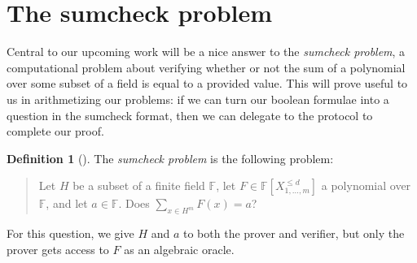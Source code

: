 \documentclass[english,12pt]{reedthesis}
\theoremstyle{plain}
\newtheorem{thm}{Theorem}[section]
\theoremstyle{definition}
\newtheorem{defn}[defn]{Definition}
\theoremstyle{remark}
\DeclarePairedDelimiter{\abs}{\lvert}{\rvert}
\begin{document}





\section{The sumcheck problem}

Central to our upcoming work will be a nice answer to the \emph{sumcheck
  problem}, a computational problem about verifying whether or not the sum of a
polynomial over some subset of a field is equal to a provided value. This will
prove useful to us in arithmetizing our problems: if we can turn our boolean
formulae into a question in the sumcheck format, then we can delegate to the
protocol to complete our proof.

\begin{defn}[{\cite{LFKN92}}]\label{def:sumcheck}
  The \emph{sumcheck problem} is the following problem:
  \begin{quote}
    Let $H$ be a subset of a finite field $\mathbb{F}$, let
    $F \in \mathbb{F}[X_{1, \ldots, m}^{\le d}]$ a polynomial over $\mathbb{F}$, and let
    $a \in \mathbb{F}$. Does $\sum_{x \in H^{m}}F(x) = a$?
  \end{quote}
  For this question, we give $H$ and $a$ to both the prover and verifier, but
  only the prover gets access to $F$ as an algebraic oracle.
\end{defn}
\end{document}
